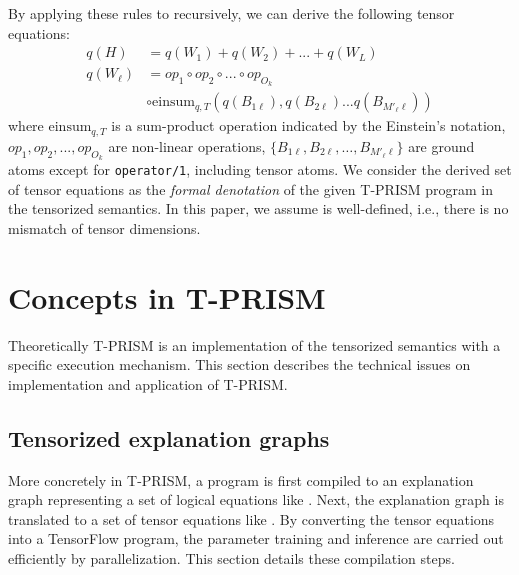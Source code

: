 \documentclass[a4paper]{report}
\newcommand{\einsum}{\mbox{einsum}}
\begin{document}
By applying these rules to  recursively, we
can derive the following tensor equations:
%
\begin{align}\nonumber
q(H) & = q(W_1) + q(W_2) + ... + q(W_{L}) \\ \nonumber
q(W_{\ell}) & = op_1 \circ op_2 \circ ... \circ op_{O_k} \\
& \circ \einsum_{q,T}(q(B_{1\ell}), q(B_{2\ell}) ... q(B_{M'_\ell \ell}))
\label{eq:tprism_eqs}
\end{align}
%
where $\einsum_{q,T}$ is a sum-product operation indicated by the
Einstein's notation, $op_1, op_2, ..., op_{O_k}$ are non-linear
operations, $\{B_{1\ell}, B_{2\ell},\ldots, B_{M'_\ell \ell}\}$ are
ground atoms except for {\tt operator/1}, including tensor atoms. We
consider the derived set of tensor equations as the {\em formal
	denotation\/} of the given T-PRISM program in the tensorized
semantics.
In this paper, we assume  is well-defined,
i.e., there is no mismatch of tensor dimensions.



\section{Concepts in T-PRISM}
\label{sec:concepts}
Theoretically T-PRISM is an implementation of the tensorized semantics with a specific execution mechanism.
This section describes the technical issues on implementation and application of T-PRISM.

\subsection*{Tensorized explanation graphs}
\label{pre}
More  concretely  in  T-PRISM,  a  program is  first  compiled  to  an
explanation   graph   representing   a  set   of   logical   equations
like   .  Next,   the  explanation   graph  is
translated      to      a       set      of      tensor      equations
like  . By  converting  the tensor  equations
into a  TensorFlow program, the  parameter training and  inference are
carried out efficiently by parallelization. This section details these
compilation steps.
\end{document}

